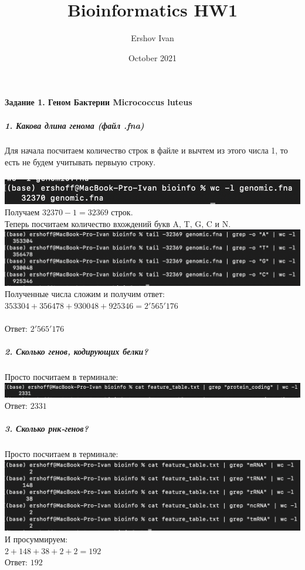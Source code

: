 \documentclass[12pt]{article}
\title{Bioinformatics HW1}
\author{Ershov Ivan}
\date{October 2021}
\begin{document}
\maketitle

\paragraph{Задание 1. Геном Бактерии Micrococcus luteus}
\subparagraph{1. Какова длина генома (файл .fna)\\}
Для начала посчитаем количество строк в файле и вычтем из этого числа 1, то есть не будем учитывать первыую строку.\\\\
\includegraphics[width=\textwidth]{image/Image1.png}\\
Получаем $32370 - 1 = 32369$ строк.\\
Теперь посчитаем количество вхождений букв A, T, G, C и N.\\
\includegraphics[width=\textwidth]{image/image2.png}\\
Полученные числа сложим и получим ответ:\\ $353304 + 356478 + 930048 + 925346 = 2'565'176$\\\\
Ответ: $2'565'176$

\subparagraph{2. Сколько генов, кодирующих белки?\\}
Просто посчитаем в терминале:\\
\includegraphics[width=\textwidth]{image/image3.png}\\
Ответ: $2331$
\pagebreak

\subparagraph{3. Сколько рнк-генов?\\}
Просто посчитаем в терминале:\\
\includegraphics[width=\textwidth]{image/image4.png}\\
И просуммируем:\\
$2 + 148 + 38 + 2 + 2 = 192$\\
Ответ: $192$
\end{document}
